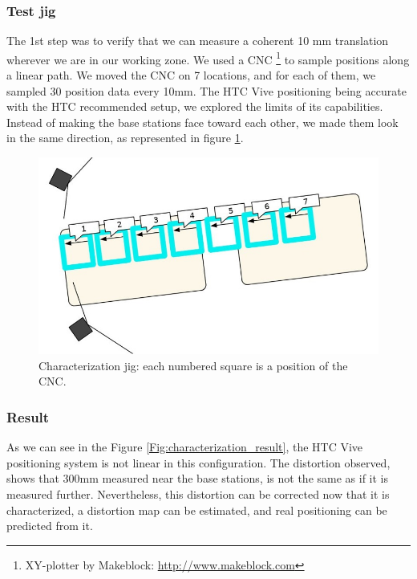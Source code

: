 \documentclass[sigchi]{acmart}
\begin{document}
\subsubsection{Test jig}
The 1st step was to verify that we can measure a coherent 10 mm translation wherever we are in our working zone.
We used a CNC \footnote{XY-plotter by Makeblock: \url{http://www.makeblock.com}} to sample positions along a
linear path. We moved the CNC on 7 locations, and for each of them, we sampled 30 position data every 10mm.
The HTC Vive positioning being accurate with the HTC recommended setup, we explored the limits of its capabilities.
Instead of making the base stations face toward each other, we made them look in the same direction, as
represented in figure \ref{Fig:characterization_jig}.

\begin{figure}[h]
  \centering
  \includegraphics[width=\linewidth]{Figures/characterization_jig.jpg}
  \caption{Characterization jig: each numbered square is a position of the CNC.}
  \label{Fig:characterization_jig}
\end{figure}

\subsubsection{Result}
As we can see in the Figure \ref{Fig:characterization_result}, the HTC Vive positioning system is not linear
in this configuration. The distortion observed, shows that 300mm measured near the base stations, is not the
same as if it is measured further. Nevertheless, this distortion can be corrected now that it is characterized,
a distortion map can be estimated, and real positioning can be predicted from it.
\end{document}
